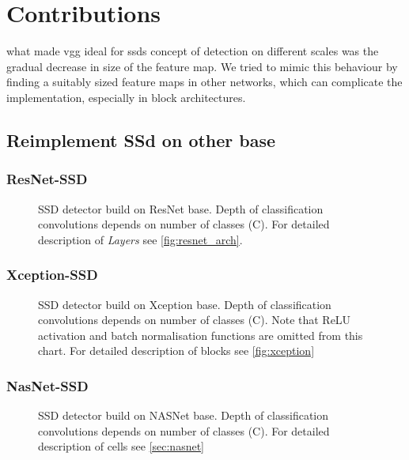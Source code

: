 \chapter{Contributions}

what made vgg ideal for ssds concept of detection on different scales was the gradual decrease in size of the feature map. We tried to mimic this behaviour by finding a suitably sized feature maps in other networks, which can complicate the implementation, especially in block architectures.


\section{Reimplement SSd on other base}
\subsection{ResNet-SSD}
\begin{figure}
    \label{fig:resnetSSD}
    \resnetSSD
    \caption{SSD detector build on ResNet base. Depth of classification convolutions depends on number of classes (C). For detailed description of \textit{Layers} see \cref{fig:resnet_arch}.}
\end{figure}

\subsection{Xception-SSD}


\begin{figure}
    \label{fig:xceptionSSD}
    \xceptionSSD
    \caption{SSD detector build on Xception base. Depth of classification convolutions depends on number of classes (C). Note that ReLU activation and batch normalisation functions are omitted from this chart. For detailed description of blocks see \cref{fig:xception}}
\end{figure}

\subsection{NasNet-SSD}

\begin{figure}
    \label{fig:nasnetSSD}
    \nasnetSSD
    \caption{SSD detector build on NASNet base. Depth of classification convolutions depends on number of classes (C). For detailed description of cells see \cref{sec:nasnet}}
\end{figure}


